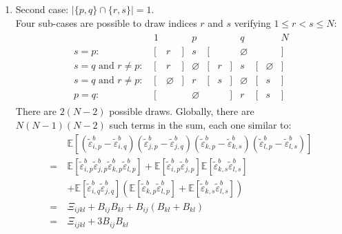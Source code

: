 \documentclass[12pt]{scrartcl}
\begin{document}
\begin{enumerate}
\item Second case: $|\{p,q\} \cap \{r,s\}| = 1$.\\
Four sub-cases are possible to draw indices $r$ and $s$ verifying $1 \le r < s \le N$:
\begin{align}
\begin{array}{rccccccccccc}
& 1 & & & p & & & & q & & & N \\
s = p: \ & \big[ & r & \big] & s & \big[ & & & \varnothing & & & \big] \\
s = q\text{ and }r \ne p: \ & \big[ & r & \big] & \varnothing & \big[ & r & \big] & s & \big[ & \varnothing & \big] \\
s = q\text{ and }r \ne p: \ & \big[ & \varnothing & \big] & r & \big[ & s & \big] & \varnothing & \big[ & s & \big] \\
p = q: \ & \big[ & & & \varnothing & & & \big] & r & \big[ & s & \big] \nonumber
\end{array}
\end{align}
There are $2(N-2)$ possible draws. Globally, there are $N(N-1)(N-2)$ such terms in the sum, each one similar to:
\begin{align}
& \mathbb{E}\left[ \left(\widetilde{\varepsilon}^b_{i,p}-\widetilde{\varepsilon}^b_{i,q}\right)\left(\widetilde{\varepsilon}^b_{j,p}-\widetilde{\varepsilon}^b_{j,q}\right) \left(\widetilde{\varepsilon}^b_{k,p}-\widetilde{\varepsilon}^b_{k,s}\right)\left(\widetilde{\varepsilon}^b_{l,p}-\widetilde{\varepsilon}^b_{l,s}\right) \right] \nonumber \\
= \ & \mathbb{E} \left[\widetilde{\varepsilon}^b_{i,p} \widetilde{\varepsilon}^b_{j,p} \widetilde{\varepsilon}^b_{k,p} \widetilde{\varepsilon}^b_{l,p}\right] + \mathbb{E}\left[\widetilde{\varepsilon}^b_{i,p} \widetilde{\varepsilon}^b_{j,p}\right] \mathbb{E}\left[\widetilde{\varepsilon}^b_{k,s} \widetilde{\varepsilon}^b_{l,s}\right] \nonumber \\
& + \mathbb{E}\left[\widetilde{\varepsilon}^b_{i,q} \widetilde{\varepsilon}^b_{j,q}\right] \left(\mathbb{E}\left[\widetilde{\varepsilon}^b_{k,p} \widetilde{\varepsilon}^b_{l,p}\right] + \mathbb{E}\left[\widetilde{\varepsilon}^b_{k,s} \widetilde{\varepsilon}^b_{l,s}\right] \right)\nonumber \\
= \ & \Xi_{ijkl} + B_{ij} B_{kl} +  B_{ij} \left(B_{kl} + B_{kl} \right) \nonumber \\
= \ & \Xi_{ijkl} + 3 B_{ij} B_{kl}
\end{align}


\end{enumerate}
\end{document}
